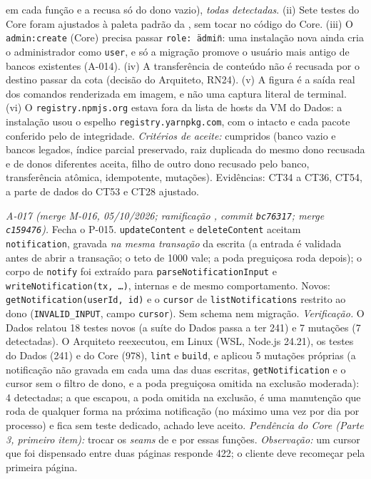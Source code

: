 em cada função e a recusa só do dono vazio), \emph{todas detectadas}. (ii) Sete testes do Core foram ajustados à paleta padrão da , sem tocar no código do Core. (iii) O \texttt{admin:create} (Core) precisa passar \texttt{role: \"admin\"}: uma instalação nova ainda cria o administrador como \texttt{user}, e só a migração promove o usuário mais antigo de bancos existentes (A-014). (iv) A transferência de conteúdo não é recusada por o destino passar da cota (decisão do Arquiteto, RN24). (v) A figura  é a saída real dos comandos renderizada em imagem, e não uma captura literal de terminal. (vi) O \texttt{registry.npmjs.org} estava fora da lista de hosts da VM do Dados: a instalação usou o espelho \texttt{registry.yarnpkg.com}, com o  intacto e cada pacote conferido pelo  de integridade. \emph{Critérios de aceite:} cumpridos (banco vazio e bancos legados, índice parcial preservado, raiz duplicada do mesmo dono recusada e de donos diferentes aceita, filho de outro dono recusado pelo banco, transferência atômica,  idempotente, mutações). Evidências: CT34 a CT36, CT54, a parte de dados do CT53 e CT28 ajustado.

\emph{A-017 (merge M-016, 05/10/2026; ramificação , commit \texttt{bc76317}; merge \texttt{c159476}).} Fecha o P-015. \texttt{updateContent} e \texttt{deleteContent} aceitam \texttt{notification}, gravada \emph{na mesma transação} da escrita (a entrada é validada antes de abrir a transação; o teto de 1000 vale; a poda preguiçosa roda depois); o corpo de \texttt{notify} foi extraído para \texttt{parseNotificationInput} e \texttt{writeNotification(tx, \ldots)}, internas e de mesmo comportamento. Novos: \texttt{getNotification(userId, id)} e o \texttt{cursor} de \texttt{listNotifications} restrito ao dono (\texttt{INVALID\_INPUT}, campo \texttt{cursor}). Sem schema nem migração. \emph{Verificação.} O Dados relatou 18 testes novos (a suíte do Dados passa a ter 241) e 7 mutações (7 detectadas). O Arquiteto reexecutou, em Linux (WSL, Node.js 24.21), os testes do Dados (241) e do Core (978), \texttt{lint} e \texttt{build}, e aplicou 5 mutações próprias (a notificação não gravada em cada uma das duas escritas, \texttt{getNotification} e o cursor sem o filtro de dono, e a poda preguiçosa omitida na exclusão moderada): 4 detectadas; a que escapou, a poda omitida na exclusão, é uma manutenção que roda de qualquer forma na próxima notificação (no máximo uma vez por dia por processo) e fica sem teste dedicado, achado leve aceito. \emph{Pendência do Core (Parte 3, primeiro item):} trocar os \emph{seams} de  e  por essas funções. \emph{Observação:} um cursor que foi dispensado entre duas páginas responde 422; o cliente deve recomeçar pela primeira página.

